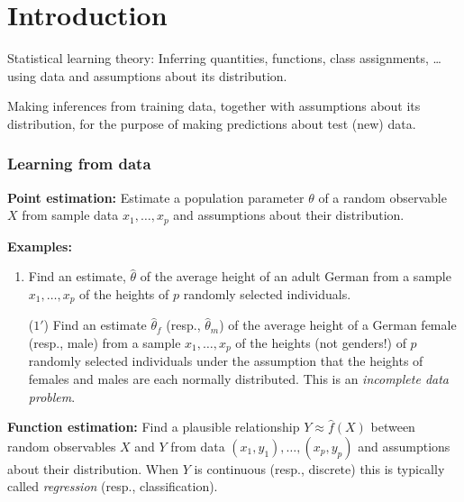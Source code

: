 \documentclass[12pt]{amsart}
\renewcommand{\hat}{\widehat}
\begin{document}
\part*{Introduction}

Statistical learning theory:
Inferring quantities, functions, class assignments, \ldots
using data and assumptions about its distribution.

Making inferences from training data, together with assumptions about its distribution,
for the purpose of making predictions about test (new) data.

\section{Learning from data}

\textbf{Point estimation:}
Estimate a population parameter $\theta$ of a random observable $X$ from sample data
$x_1,\ldots,x_p$ and assumptions about their distribution.

\textbf{Examples:}
\begin{enumerate}
    \setlength\itemsep{0.5em}
    \item Find an estimate, $\hat\theta$ of the average height of an adult German from a
    sample $x_1,\ldots,x_p$ of the heights of $p$ randomly selected individuals.
    \item[($1'$)] Find an estimate ${\hat\theta}_f$ (resp., ${\hat\theta}_m$) of the average height of 
    a German female (resp., male) from a sample $x_1,\ldots,x_p$ of the heights (not genders!) of $p$ randomly selected individuals
    under the assumption that the heights of females and males are each normally distributed.
    This is an \emph{incomplete data problem}.    
\end{enumerate}


\textbf{Function estimation:}
Find a plausible relationship $Y\approx \hat f(X)$ between random observables
$X$ and $Y$ from data $(x_1,y_1),\ldots,(x_p, y_p)$ and assumptions about their distribution.
When $Y$ is continuous (resp., discrete) this is typically called \emph{regression}
(resp., classification).
\end{document}
